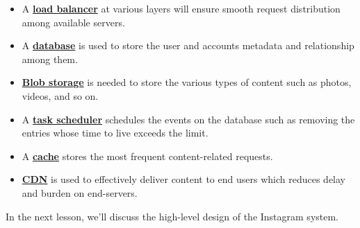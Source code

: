 \begin{itemize}
\item
\protect{}\label{fa0KhVnT0lVMuq61Whjzr}
A \href{https://www.educative.io/courses/grokking-the-system-design-interview/introduction-to-load-balancers}{\textbf{load balancer}} at various layers will ensure smooth request distribution among available servers.
\item
\protect{}\label{fIvHPro6Rlr4FT_YP-Tpa}
A \href{https://www.educative.io/courses/grokking-the-system-design-interview/introduction-to-databases}{\textbf{database}} is used to store the user and accounts metadata and relationship among them.
\item
\protect{}\label{xAvJ3PZB_z7GURK8smJnV}
\href{https://www.educative.io/courses/grokking-the-system-design-interview/system-design-a-blob-store}{\textbf{Blob storage}} is needed to store the various types of content such as photos, videos, and so on.
\item
\protect{}\label{BS2CBxMOvRh5LsdOJAanP}
A \href{https://www.educative.io/courses/grokking-the-system-design-interview/system-design-the-distributed-task-scheduler}{\textbf{task scheduler}} schedules the events on the database such as removing the entries whose time to live exceeds the limit.
\item
\protect{}\label{Ac4TF_B0hT9ONC4gMmu-K}
A \href{https://www.educative.io/courses/grokking-the-system-design-interview/system-design-the-distributed-cache}{\textbf{cache}} stores the most frequent content-related requests.
\item
\protect{}\label{wBvT_OOF0-5zbAwNTtLaq}
\href{https://www.educative.io/courses/grokking-the-system-design-interview/system-design-the-content-delivery-network-cdn}{\textbf{CDN}} is used to effectively deliver content to end users which reduces delay and burden on end-servers.
\end{itemize}

In the next lesson, we'll discuss the high-level design of the Instagram system.



